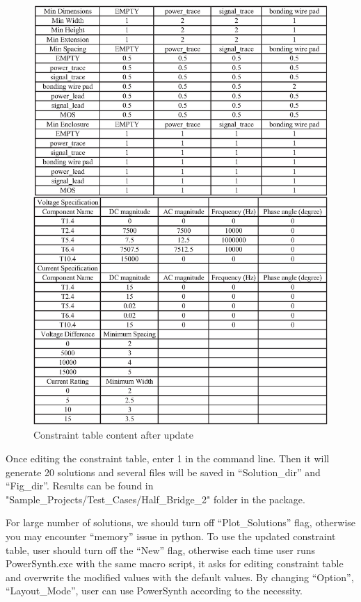 \documentclass[11pt]{article}
\begin{document}
\begin{enumerate}
    \begin{figure}[H]
    \centering
    \includegraphics[width=\linewidth, height=8.5 in ]{figs/v_1.9_figs/cmd_re_4.eps}
    \caption{Constraint table content after update}
    \label{cons_up}
    \end{figure}    
    Once editing the constraint table, enter 1 in the command line.
    Then it will generate 20 solutions and several files will be saved in “Solution\_dir” and “Fig\_dir”. Results can be found in "Sample\_Projects/Test\_Cases/Half\_Bridge\_2" folder in the package.
    
    For large number of solutions, we should turn off “Plot\_Solutions” flag, otherwise you may encounter “memory” issue in python.
    To use the updated constraint table, user should turn off the “New” flag, otherwise each time user runs PowerSynth.exe with the same macro script, it asks for editing constraint table and overwrite the modified values with the default values.
    By changing “Option”, “Layout\_Mode”, user can use PowerSynth according to the necessity.

    

\end{enumerate}
\end{document}
